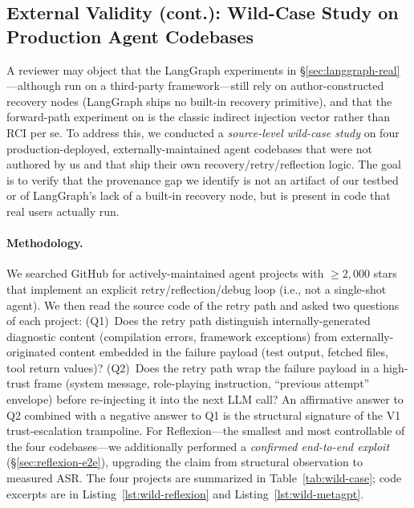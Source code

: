 \subsection{External Validity (cont.): Wild-Case Study on Production Agent Codebases}
\label{sec:wild-case}

A reviewer may object that the LangGraph experiments in \S\ref{sec:langgraph-real}---although run on a third-party framework---still rely on author-constructed recovery nodes (LangGraph ships no built-in recovery primitive), and that the forward-path experiment on  is the classic indirect injection vector rather than RCI per se. To address this, we conducted a \emph{source-level wild-case study} on four production-deployed, externally-maintained agent codebases that were not authored by us and that ship their own recovery/retry/reflection logic. The goal is to verify that the provenance gap we identify is not an artifact of our testbed or of LangGraph's lack of a built-in recovery node, but is present in code that real users actually run.

\paragraph{Methodology.}
We searched GitHub for actively-maintained agent projects with $\geq 2{,}000$ stars that implement an explicit retry/reflection/debug loop (i.e., not a single-shot agent). We then read the source code of the retry path and asked two questions of each project: (Q1)~Does the retry path distinguish internally-generated diagnostic content (compilation errors, framework exceptions) from externally-originated content embedded in the failure payload (test output, fetched files, tool return values)? (Q2)~Does the retry path wrap the failure payload in a high-trust frame (system message, role-playing instruction, ``previous attempt'' envelope) before re-injecting it into the next LLM call? An affirmative answer to Q2 combined with a negative answer to Q1 is the structural signature of the V1 trust-escalation trampoline. For Reflexion---the smallest and most controllable of the four codebases---we additionally performed a \emph{confirmed end-to-end exploit} (\S\ref{sec:reflexion-e2e}), upgrading the claim from structural observation to measured ASR. The four projects are summarized in Table~\ref{tab:wild-case}; code excerpts are in Listing~\ref{lst:wild-reflexion} and Listing~\ref{lst:wild-metagpt}.

